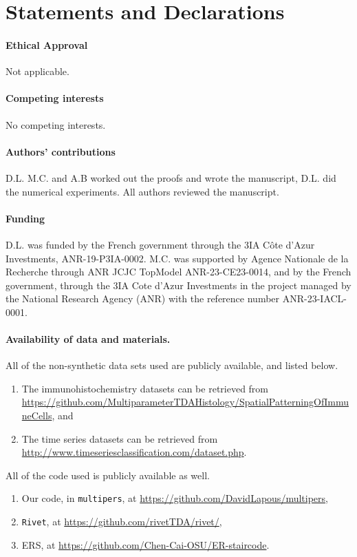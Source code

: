 \documentclass{article}
\begin{document}
\section*{Statements and Declarations}
\paragraph{Ethical Approval}
Not applicable.
\paragraph{Competing interests}
No competing interests.
\paragraph{Authors' contributions}
D.L. M.C. and A.B worked out the proofs and wrote the manuscript, D.L. did the numerical experiments. All authors reviewed the manuscript. 
\paragraph{Funding}
D.L. was funded by the French government through the 3IA Côte d’Azur Investments, ANR-19-P3IA-0002.
M.C. was supported by Agence Nationale de la Recherche through ANR JCJC TopModel ANR-23-CE23-0014, and by the French government, through the 3IA Cote d’Azur Investments in the project
managed by the National Research Agency (ANR) with the reference number ANR-23-IACL-0001.
\paragraph{Availability of data and materials.}
All of the non-synthetic data sets used are publicly available, and listed below.
\begin{enumerate}
    \item The immunohistochemistry datasets can be retrieved from
    \\
    \url{https://github.com/MultiparameterTDAHistology/SpatialPatterningOfImmuneCells}, and
    \item The time series datasets can be retrieved from \url{http://www.timeseriesclassification.com/dataset.php}.
\end{enumerate}
All of the code used is publicly available as well.
\begin{enumerate}
    \item Our code, in \texttt{multipers}, at \url{https://github.com/DavidLapous/multipers},
    \item \texttt{Rivet}, at \url{https://github.com/rivetTDA/rivet/},
    \item ERS, at \url{https://github.com/Chen-Cai-OSU/ER-staircode}.
\end{enumerate}


\end{document}
